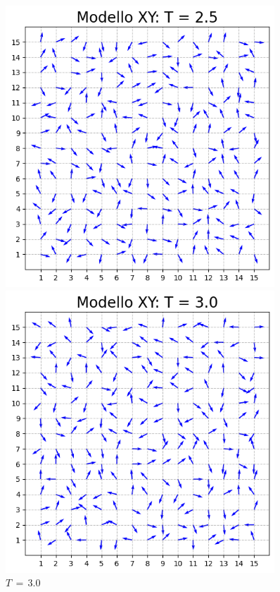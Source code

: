 \begin{figure}[H]
    \begin{minipage}{0.45\textwidth}  
      \centering
      \includegraphics[page=1, width=0.9\textwidth]{Immagini/simModelloXY/conf_t2.5.png}
      \caption{$T\,=\,2.5$}
    \end{minipage}\hfill
    \begin{minipage}{0.45\textwidth}  
      \centering
      \includegraphics[page=1, width=0.9\textwidth]{Immagini/simModelloXY/conf_t3.0.png}
      \caption{$T\,=\,3.0$}
    \end{minipage}
    
\end{figure}


